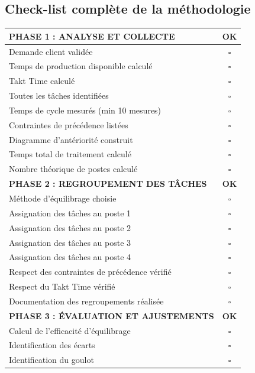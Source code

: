 \documentclass[12pt,a4paper]{article}
\begin{document}
\subsection{Check-list complète de la méthodologie}

\begin{table}[H]
\centering
\begin{tabular}{|p{10cm}|c|}
\hline
\textbf{PHASE 1 : ANALYSE ET COLLECTE} & \textbf{OK} \\
\hline
Demande client validée & $\square$ \\
\hline
Temps de production disponible calculé & $\square$ \\
\hline
Takt Time calculé & $\square$ \\
\hline
Toutes les tâches identifiées & $\square$ \\
\hline
Temps de cycle mesurés (min 10 mesures) & $\square$ \\
\hline
Contraintes de précédence listées & $\square$ \\
\hline
Diagramme d'antériorité construit & $\square$ \\
\hline
Temps total de traitement calculé & $\square$ \\
\hline
Nombre théorique de postes calculé & $\square$ \\
\hline
\textbf{PHASE 2 : REGROUPEMENT DES TÂCHES} & \textbf{OK} \\
\hline
Méthode d'équilibrage choisie & $\square$ \\
\hline
Assignation des tâches au poste 1 & $\square$ \\
\hline
Assignation des tâches au poste 2 & $\square$ \\
\hline
Assignation des tâches au poste 3 & $\square$ \\
\hline
Assignation des tâches au poste 4 & $\square$ \\
\hline
Respect des contraintes de précédence vérifié & $\square$ \\
\hline
Respect du Takt Time vérifié & $\square$ \\
\hline
Documentation des regroupements réalisée & $\square$ \\
\hline
\textbf{PHASE 3 : ÉVALUATION ET AJUSTEMENTS} & \textbf{OK} \\
\hline
Calcul de l'efficacité d'équilibrage & $\square$ \\
\hline
Identification des écarts & $\square$ \\
\hline
Identification du goulot & $\square$ \\

\end{tabular}
\end{table}
\end{document}
